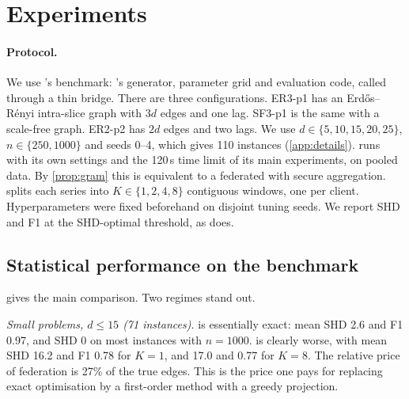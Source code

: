 \section{Experiments}
\label{sec:experiments}

\paragraph{Protocol.}
We use \exdbn's benchmark: \exdbn's generator, parameter grid and evaluation code, called
through a thin bridge. There are three configurations. ER3-p1 has an Erd\H{o}s--R\'enyi
intra-slice graph with $3d$ edges and one lag. SF3-p1 is the same with a scale-free graph.
ER2-p2 has $2d$ edges and two lags. We use $d\in\{5,10,15,20,25\}$, $n\in\{250,1000\}$ and
seeds 0--4, which gives 110 instances (\cref{app:details}). \exdbn{} runs with its own
settings and the 120\,s time limit of its main experiments, on pooled data. By
\cref{prop:gram} this is equivalent to a federated \exdbn{} with secure aggregation.
\feddbn{} splits each series into $K\in\{1,2,4,8\}$ contiguous windows, one per client.
Hyperparameters were fixed beforehand on disjoint tuning seeds. We report SHD and F1 at the
SHD-optimal threshold, as \exdbn{} does.

\subsection{Statistical performance on the \exdbn{} benchmark}
\label{sec:exp-accuracy}

\begin{table}[t]
\centering
\caption{\exdbn{} benchmark: mean over seeds (5, or 4 where \exdbn's generator gave up). \exdbn{}
on pooled data (SHD, F1, final MIP gap after 120\,s) against \feddbn{} with $K$ clients
($K=1$ is centralised \psidbn). ``edges'' is the number of true edges in $W$ and $A$.}
\label{tab:main}
\small

\end{table}

 gives the main comparison. Two regimes stand out.

\emph{Small problems, $d\le 15$ (71 instances).} \exdbn{} is essentially exact: mean SHD
2.6 and F1 0.97, and SHD 0 on most instances with $n=1000$. \feddbn{} is clearly worse, with
mean SHD 16.2 and F1 0.78 for $K=1$, and 17.0 and 0.77 for $K=8$. The relative price of
federation is 27\% of the true edges. This is the price one pays for replacing exact
optimisation by a first-order method with a greedy projection.

